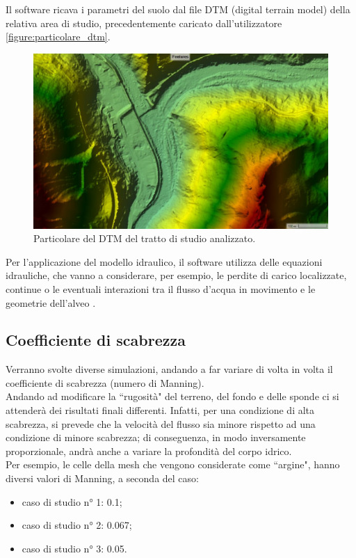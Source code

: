Il software ricava i parametri del suolo dal file DTM (digital terrain model) della relativa area di studio, precedentemente caricato dall'utilizzatore \eqref{figure:particolare_dtm}.

\begin{figure}[htb] \centering
    \includegraphics[scale=0.3]{immagini/particolare_dtm.JPG}
    \caption{Particolare del DTM del tratto di studio analizzato.}
    \label{figure:particolare_dtm}
    \end{figure}

Per l'applicazione del modello idraulico, il software utilizza delle equazioni idrauliche, che vanno a considerare, per esempio, le perdite di carico localizzate, continue o le eventuali interazioni tra il flusso d'acqua in movimento e le geometrie dell'alveo \cite{hydraulic_equations}.

\subsection{Coefficiente di scabrezza}
Verranno svolte diverse simulazioni, andando a far variare di volta in volta il coefficiente di scabrezza (numero di Manning).\\
Andando ad modificare la ``rugosità" del terreno, del fondo e delle sponde ci si attenderà dei risultati finali differenti. Infatti, per una condizione di alta scabrezza, si prevede che la velocità del flusso sia minore rispetto ad una condizione di minore scabrezza; di conseguenza, in modo inversamente proporzionale, andrà anche a variare la profondità del corpo idrico.\\
Per esempio, le celle della mesh che vengono considerate come ``argine", hanno diversi valori di Manning, a seconda del caso:
\begin{itemize}
    \item caso di studio n° 1: 0.1;
    \item caso di studio n° 2: 0.067;
    \item caso di studio n° 3: 0.05.
\end{itemize}


